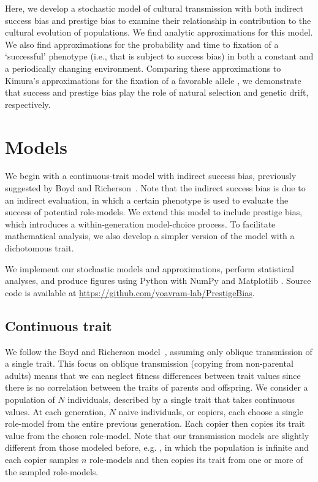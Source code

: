 \documentclass[12pt]{extarticle}
\begin{document}
Here, we develop a stochastic model of cultural transmission with both indirect success bias and prestige bias to examine their relationship in contribution to the cultural evolution of populations.
We find analytic approximations for this model. We also find approximations for the probability and time to fixation of a `successful' phenotype (i.e., that is subject to success bias) in both a constant and a periodically changing environment.
Comparing these approximations to Kimura's approximations for the fixation of a favorable allele \citep{kimura,kimura_average}, we demonstrate that success and prestige bias play the role of natural selection and genetic drift, respectively. 

\section*{Models}
We begin with a continuous-trait model with indirect success bias, previously suggested by Boyd and Richerson~\citep{evolutionBook}. Note that the indirect success bias is due to an indirect evaluation, in which a certain phenotype is used to evaluate the success of potential role-models.
We extend this model to include prestige bias, which introduces a within-generation model-choice process.
To facilitate mathematical analysis, we also develop a simpler version of the model with a dichotomous trait.

We implement our stochastic models and approximations, perform statistical analyses, and produce figures using Python \citep{python} with NumPy \citep{numpy} and Matplotlib \citep{mathplotlib}. 
Source code is available at \href{https://github.com/yoavram-lab/PrestigeBias}{https://github.com/yoavram-lab/PrestigeBias}.

\subsection*{Continuous trait}
We follow the Boyd and Richerson model~\citep{evolutionBook}, assuming only oblique transmission of a single trait. 
This focus on oblique transmission (copying from non-parental adults) means that we can neglect fitness differences between trait values since there is no correlation between the traits of parents and offspring.
We consider a population of $N$ individuals, described by a single trait that takes continuous values.
At each generation, $N$ naive individuals, or copiers, each choose a single role-model from the entire previous generation. Each copier then copies its trait value from the chosen role-model.
Note that our transmission models are slightly different from those modeled before, e.g. \citep{cumul_culture,Denton2021,evolutionBook}, in which the population is infinite and each copier samples $n$ role-models and then copies its trait from one or more of the sampled role-models.
\end{document}
